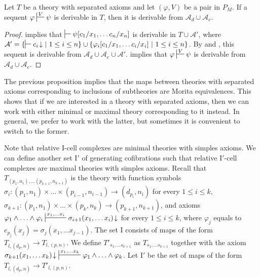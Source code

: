 \documentclass[reqno]{amsart}
\theoremstyle{definition}
\theoremstyle{remark}
\newcommand{\I}{\mathrm{I}}
\numberwithin{figure}{section}
\begin{document}
\begin{prop}
Let $T$ be a theory with separated axioms and let $(\varphi,V)$ be a pair in $P_M$.
If a sequent $\varphi \sststile{}{V} \psi$ is derivable in $T$, then it is derivable from $\mathcal{A}_d \cup \mathcal{A}_e$.
\end{prop}
\begin{proof}
 implies that $\sststile{}{} \psi[c_1/x_1, \ldots c_n/x_n]$ is derivable in $T \cup \mathcal{A}'$, where $\mathcal{A}' = \{ \sststile{}{} c_i\!\downarrow |\ 1 \leq i \leq n \} \cup \{ \varphi_i[c_1/x_1, \ldots c_i/x_i]\ |\ 1 \leq i \leq n \}$.
By  and , this sequent is derivable from $\mathcal{A}_d \cup \mathcal{A}_e \cup \mathcal{A}'$.
 implies that $\varphi \sststile{}{V} \psi$ is derivable from $\mathcal{A}_d \cup \mathcal{A}_e$.
\end{proof}

The previous proposition implies that the maps between theories with separated axioms corresponding to inclusions of subtheories are Morita equivalences.
This shows that if we are interested in a theory with separated axioms, then we can work with either minimal or maximal theory corresponding to it instead.
In general, we prefer to work with the latter, but sometimes it is convenient to switch to the former.

Note that relative $\I$-cell complexes are minimal theories with simples axioms.
We can define another set $\I'$ of generating cofibrations such that relative $\I'$-cell complexes are maximal theories with simples axioms.
Recall that $T_{(p_1,n_1), \ldots (p_{k+1},n_{k+1})}$ is the theory with function symbols $\sigma_i : (p_1,n_1) \times \ldots \times (p_{i-1},n_{i-1}) \to (d_{p_i},n_i)$ for every $1 \leq i \leq k$,
$\sigma_{k+1} : (p_1,n_1) \times \ldots \times (p_k,n_k) \to (p_{k+1},n_{k+1})$, and axioms $\varphi_1 \land \ldots \land \varphi_i \sststile{}{x_1, \ldots x_i} \sigma_{i+1}(x_1, \ldots x_i)\!\downarrow$ for every $1 \leq i \leq k$,
where $\varphi_j$ equals to $e_{p_j}(x_j) = \sigma_j(x_1, \ldots x_{j-1})$.
The set $\I$ consists of maps of the form $T_{l, (d_p,n)} \to T_{l, (p,n)}$.
We define $T'_{s_1, \ldots s_{k+1}}$ as $T_{s_1, \ldots s_{k+1}}$ together with the axiom $\sigma_{k+1}(x_1, \ldots x_k)\!\downarrow\ \sststile{}{x_1, \ldots x_k} \varphi_1 \land \ldots \land \varphi_k$.
Let $\I'$ be the set of maps of the form $T_{l, (d_p,n)} \to T'_{l, (p,n)}$.
\end{document}
